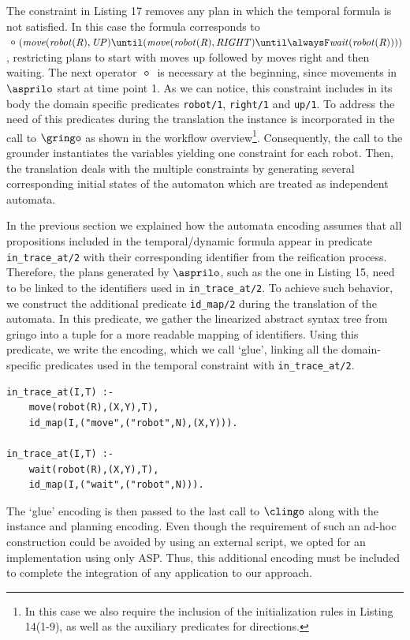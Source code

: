 The constraint in Listing 17 removes any plan in which the temporal formula is not satisfied. In this case the formula corresponds to $\Next (\mathit{move(robot(R),UP)} \until (\mathit{move(robot(R),RIGHT)} \until \alwaysF \mathit{wait(robot(R))}))$, restricting plans to start with moves up followed by moves right and then waiting. The next operator $\Next$ is necessary at the beginning, since movements in $\asprilo$ start at time point 1. As we can notice, this constraint includes in its body the domain specific predicates \texttt{robot/1}, \texttt{right/1} and \texttt{up/1}.
To address the need of this predicates during the translation the instance is incorporated in the call to $\gringo$ as shown in the workflow overview\footnote{In this case we also require the inclusion of the initialization rules in Listing 14(1-9), as well as the auxiliary predicates for directions.}. 
Consequently, the call to the grounder instantiates the variables yielding one constraint for each robot. Then, the translation deals with the multiple constraints by generating several corresponding initial states of the automaton which are treated as independent automata. 


In the previous section we explained how the automata encoding assumes that all propositions included in the temporal/dynamic formula appear in predicate \texttt{in\_trace\_at/2} with their corresponding identifier from the reification process. 
Therefore, the plans generated by $\asprilo$, such as the one in Listing 15, need to be linked to the identifiers used in \texttt{in\_trace\_at/2}. To achieve such behavior, we construct the additional predicate \texttt{id\_map/2} during the translation of the automata. In this predicate, we gather the linearized abstract syntax tree from gringo into a tuple for a more readable mapping of identifiers. Using this predicate, we write the encoding, which we call `glue', linking all the domain-specific predicates used in the temporal constraint with \texttt{in\_trace\_at/2}. 

\begin{center}
    \begin{lstlisting}[] 
in_trace_at(I,T) :- 
    move(robot(R),(X,Y),T), 
    id_map(I,("move",("robot",N),(X,Y))).

in_trace_at(I,T) :- 
    wait(robot(R),(X,Y),T), 
    id_map(I,("wait",("robot",N))).
    \end{lstlisting}
\end{center}

The `glue' encoding is then passed to the last call to $\clingo$ along with the instance and planning encoding. Even though the requirement of such an ad-hoc construction could be avoided by using an external script, we opted for an implementation using only ASP. Thus, this additional encoding must be included to complete the integration of any application to our approach.
